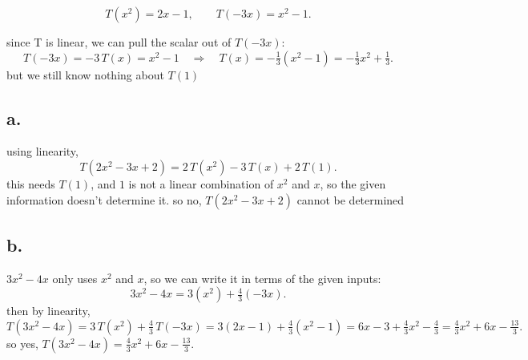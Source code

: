 \documentclass{article}
\begin{document}
\[
T(x^2) = 2x - 1, \qquad T(-3x) = x^2 - 1.
\]


since T is linear, we can pull the scalar out of $T(-3x)$:
\[
T(-3x) = -3\,T(x) = x^2 - 1
\quad \Rightarrow \quad
T(x) = -\tfrac{1}{3}(x^2 - 1) = -\tfrac{1}{3}x^2 + \tfrac{1}{3}.
\]
but we still know nothing about $T(1)$

\subsection*{a.}

using linearity,
\[
T(2x^2 - 3x + 2) = 2\,T(x^2) - 3\,T(x) + 2\,T(1).
\]
this needs $T(1)$, and $1$ is not a linear combination of $x^2$ and $x$, so the given
information doesn't determine it. so no, $T(2x^2 - 3x + 2)$ cannot be determined

\subsection*{b.}

$3x^2 - 4x$ only uses $x^2$ and $x$, so we can write it in terms of the given inputs:
\[
3x^2 - 4x = 3(x^2) + \tfrac{4}{3}(-3x).
\]
then by linearity,
\[
T(3x^2 - 4x) = 3\,T(x^2) + \tfrac{4}{3}\,T(-3x)
= 3(2x - 1) + \tfrac{4}{3}(x^2 - 1)
= 6x - 3 + \tfrac{4}{3}x^2 - \tfrac{4}{3}
= \tfrac{4}{3}x^2 + 6x - \tfrac{13}{3}.
\]
so yes, $T(3x^2 - 4x) = \tfrac{4}{3}x^2 + 6x - \tfrac{13}{3}$.
\end{document}

